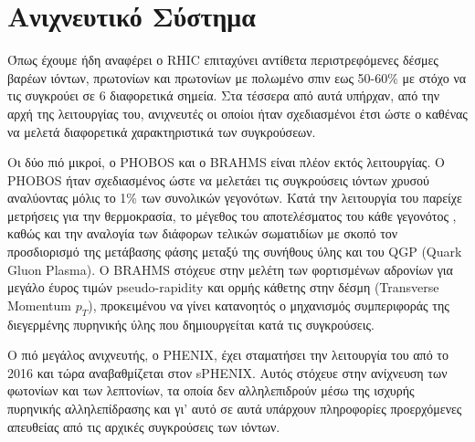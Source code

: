 \chapter{Ανιχνευτικό Σύστημα }

	Όπως έχουμε ήδη αναφέρει ο RHIC επιταχύνει αντίθετα περιστρεφόμενες δέσμες βαρέων ιόντων, πρωτονίων και πρωτονίων με πολωμένο σπιν εως 50-60\% με στόχο να τις συγκρούει σε 6 διαφορετικά σημεία. Στα τέσσερα από αυτά υπήρχαν, από την αρχή της λειτουργίας του, ανιχνευτές οι οποίοι ήταν σχεδιασμένοι έτσι ώστε ο καθένας να μελετά διαφορετικά χαρακτηριστικά των συγκρούσεων.
	
	 Οι δύο πιό μικροί, ο PHOBOS και ο BRAHMS είναι πλέον εκτός λειτουργίας. Ο PHOBOS ήταν σχεδιασμένος ώστε να μελετάει τις συγκρούσεις ιόντων χρυσού αναλύοντας μόλις το 1\% των συνολικών γεγονότων. Κατά την λειτουργία του παρείχε μετρήσεις για την θερμοκρασία, το μέγεθος του αποτελέσματος του κάθε γεγονότος , καθώς και την αναλογία των διάφορων τελικών σωματιδίων με σκοπό τον προσδιορισμό της μετάβασης φάσης μεταξύ της συνήθους ύλης και του QGP (Quark Gluon Plasma). Ο BRAHMS στόχευε στην μελέτη των φορτισμένων αδρονίων για μεγάλο έυρος τιμών pseudo-rapidity και ορμής κάθετης στην δέσμη (Transverse Momentum $p_T$), προκειμένου να γίνει κατανοητός ο μηχανισμός συμπεριφοράς της διεγερμένης πυρηνικής ύλης που δημιουργείται κατά τις συγκρούσεις. 
	
	Ο πιό μεγάλος ανιχνευτής, ο PHENIX, έχει σταματήσει την λειτουργία του από το 2016 και τώρα αναβαθμίζεται στον sPHENIX. Αυτός στόχευε στην ανίχνευση των φωτονίων και των λεπτονίων, τα οποία δεν αλληλεπιδρούν μέσω της ισχυρής πυρηνικής αλληλεπίδρασης και γι' αυτό σε αυτά υπάρχουν πληροφορίες προερχόμενες απευθείας από τις αρχικές συγκρούσεις των ιόντων. 
	
